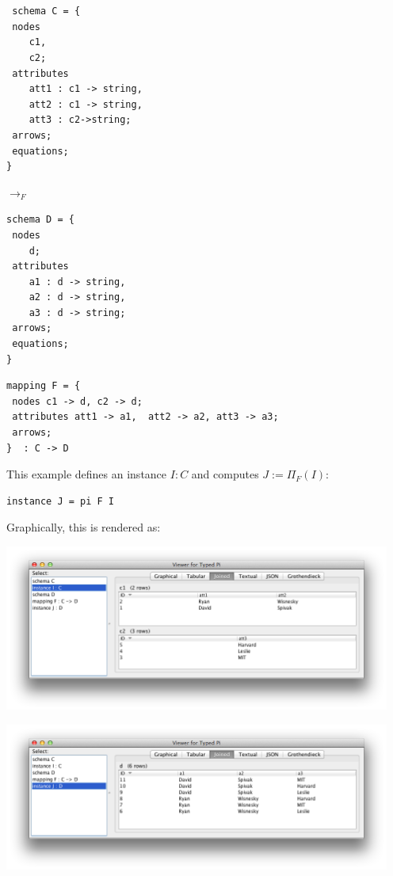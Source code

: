 \documentclass[12pt]{article}
\begin{document}
 \begin{minipage}{0.4\textwidth}
\begin{verbatim} 


 schema C = {
 nodes 
 	c1, 
 	c2;
 attributes
	att1 : c1 -> string,
	att2 : c1 -> string, 
	att3 : c2->string;
 arrows;
 equations;
}
    \end{verbatim}
  \end{minipage}
   \hspace{.5in} $\to_F$ \hspace{.5in}
  \begin{minipage}{0.4\textwidth}
\begin{verbatim} 
schema D = {
 nodes 
 	d;
 attributes
 	a1 : d -> string, 
 	a2 : d -> string, 
 	a3 : d -> string;
 arrows;
 equations;
}  
\end{verbatim} \end{minipage}
\begin{verbatim}
mapping F = {
 nodes c1 -> d, c2 -> d;
 attributes att1 -> a1,  att2 -> a2, att3 -> a3;
 arrows;
}  : C -> D
\end{verbatim}
This example defines an instance $I : C$ and computes $J := \Pi_F(I)$:
\begin{verbatim}
instance J = pi F I
\end{verbatim}
Graphically, this is rendered as:

\begin{center}
\includegraphics[width=5in]{piI}

\includegraphics[width=5in]{piJ}
\end{center}
\end{document}
